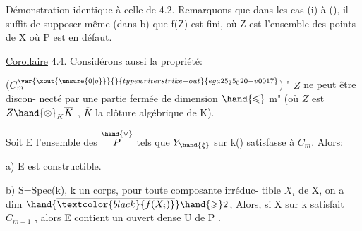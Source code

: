 Démonstration identique à celle de 4.2.   Remarquons que dans
les cas (i) à (), il suffit de supposer même (dans b) que  f(Z) est
fini, où Z est l'ensemble des points de X où  P est en défaut.

\uline{Corollaire} 4.4.    Considérons aussi la propriété:

($C_m^{\var{\xout{\unsure{0|o}}}{}{typewriter strike-out}{ega25_25_020-v0017}}$)   " $\overline{Z}$ ne peut être discon-%
necté par une partie fermée de dimension  $\hand{\leqslant}$ m" (où $\overline{Z}$ est $Z\hand{\otimes}_K\overline{K}$ , $\overline{K}$
la clôture  algébrique de K).

Soit E l'ensemble des \hand{$\xi \in$} $\overset{\hand{\vee}}{P}$  tels que  $Y_{\hand{\xi}}$ sur k(\hand{$\xi$}) satisfasse à $C_m$.
Alors:

a)  E est constructible.

b)    S=Spec(k), k un corps,   pour toute composante irréduc-%
tible  $X_i$ de X, on a dim $\hand{\overline{\textcolor{black}{f(X_i)}}} \hand{\geqslant} 2$, Alors, si X sur k satisfait $C_{m+1}$ ,
alors E\hand{$_{\xi}$} contient un ouvert dense U de P .


